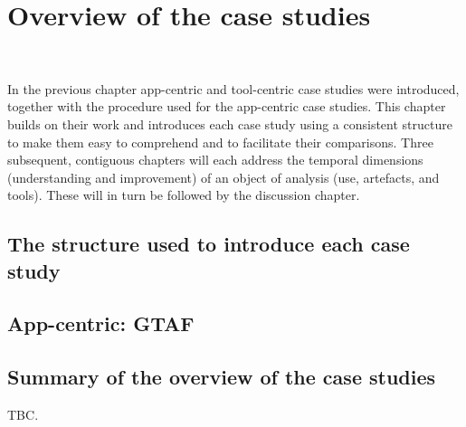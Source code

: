 \chapter{Overview of the case studies}~\label{chapter-case-studies-overview}

In the previous chapter app-centric and tool-centric case studies were introduced, together with the procedure used for the app-centric case studies. This chapter builds on their work and introduces each case study using a consistent structure to make them easy to comprehend and to facilitate their comparisons. Three subsequent, contiguous chapters will each address the temporal dimensions (understanding and improvement) of an object of analysis (use, artefacts, and tools). These will in turn be followed by the discussion chapter.


\section{The structure used to introduce each case study}

\section{App-centric: GTAF}



\section{Summary of the overview of the case studies}
TBC.
